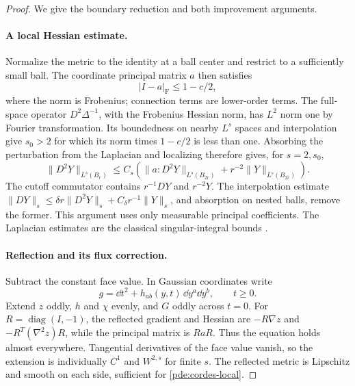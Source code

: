 \begin{proof}
We give the boundary reduction and both improvement arguments.

\paragraph{A local Hessian estimate.}
Normalize the metric to the identity at a ball center and restrict to a
sufficiently small ball.  The coordinate principal matrix \(a\) then
satisfies
\[
 |I-a|_{\mathrm F}\le1-c/2,
\]
where the norm is Frobenius; connection terms are lower-order terms.
The full-space operator \(D^2\Delta^{-1}\), with the Frobenius Hessian
norm, has \(L^2\) norm one by Fourier transformation.  Its boundedness on
nearby \(L^s\) spaces and interpolation give \(s_0>2\) for which its
norm times \(1-c/2\) is less than one.  Absorbing the perturbation from
the Laplacian and localizing therefore gives, for \(s=2,s_0\),
\begin{equation}
 \|D^2Y\|_{L^s(B_r)}
 \le C_s\left(\|a:D^2Y\|_{L^s(B_{2r})}
                 +r^{-2}\|Y\|_{L^s(B_{2r})}\right).
 \label{pde:cordes-local}
\end{equation}
The cutoff commutator contains \(r^{-1}DY\) and \(r^{-2}Y\).
The interpolation estimate
\(\|DY\|_s\le\delta r\|D^2Y\|_s+C_\delta r^{-1}\|Y\|_s\),
and absorption on nested balls, remove the former.  This argument uses
only measurable principal coefficients.  The Laplacian estimates are the
classical singular-integral bounds
\cite{CalderonZygmund1952,GilbargTrudinger2001}.

\paragraph{Reflection and its flux correction.}
Subtract the constant face value.  In Gaussian coordinates write
\[
 g=\dd t^2+h_{ab}(y,t)\,\dd y^a\dd y^b,\qquad t\ge0.
\]
Extend \(z\) oddly, \(h\) and \(\chi\) evenly, and \(G\) oddly across
\(t=0\).  For \(R=\operatorname{diag}(I,-1)\), the reflected gradient
and Hessian are \(-R\nabla z\) and \(-R^T(\nabla^2z)R\), while the
principal matrix is \(RaR\).  Thus the equation holds almost everywhere.
Tangential derivatives of the face value vanish, so the extension is
individually \(C^1\) and \(W^{2,s}\) for finite \(s\).  The reflected
metric is Lipschitz and smooth on each side, sufficient for
\eqref{pde:cordes-local}.


\end{proof}

